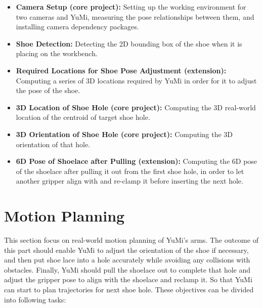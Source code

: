 \begin{itemize}
    \item \textbf{Camera Setup (core project):} Setting up the working environment for two cameras and YuMi, measuring the pose relationships between them, and installing camera dependency packages.
    \item \textbf{Shoe Detection:} Detecting the 2D bounding box of the shoe when it is placing on the workbench.
    \item \textbf{Required Locations for Shoe Pose Adjustment (extension):} Computing a series of 3D locations required by YuMi in order for it to adjust the pose of the shoe.
    \item \textbf{3D Location of Shoe Hole (core project):} Computing the 3D real-world location of the centroid of target shoe hole.
    \item \textbf{3D Orientation of Shoe Hole (core project):} Computing the 3D orientation of that hole.
    \item \textbf{6D Pose of Shoelace after Pulling (extension):} Computing the 6D pose of the shoelace after pulling it out from the first shoe hole, in order to let another gripper align with and re-clamp it before inserting the next hole.
\end{itemize}


\section{Motion Planning}
This section focus on real-world motion planning of YuMi's arms. The outcome of this part should enable YuMi to adjust the orientation of the shoe if necessary, and then put shoe lace into a hole accurately while avoiding any collisions with obstacles. Finally, YuMi should pull the shoelace out to complete that hole and adjust the gripper pose to align with the shoelace and reclamp it. So that YuMi can start to plan trajectories for next shoe hole. These objectives can be divided into following tasks:

